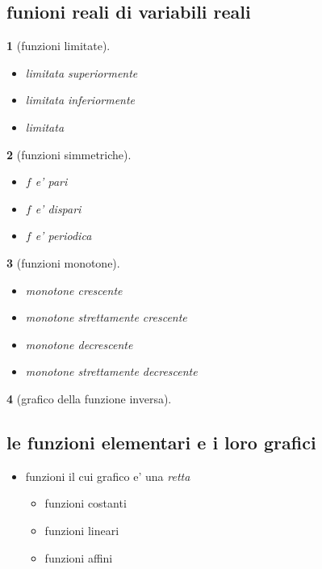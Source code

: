 \documentclass{article}
\theoremstyle{mystyle}
\newtheorem*{mydefinition}{}
\begin{document}
\subsection{funioni reali di variabili reali}
\begin{mydefinition}[funzioni limitate]
    \begin{itemize}
        \item limitata superiormente
        \item limitata inferiormente
        \item limitata
    \end{itemize}
\end{mydefinition}
\begin{mydefinition}[funzioni simmetriche]
\begin{itemize}
    \item $f$ e' \emph{pari}
    \item $f$ e' \emph{dispari}
    \item $f$ e' \emph{periodica}
\end{itemize}
    
\end{mydefinition}
\begin{mydefinition}[funzioni monotone]
\begin{itemize}
    \item \emph{monotone crescente}
    \item \emph{monotone strettamente crescente}
    \item \emph{monotone decrescente}
    \item \emph{monotone strettamente decrescente}
\end{itemize}
    
\end{mydefinition}
\begin{mydefinition}[grafico della funzione inversa]
    
\end{mydefinition}
\subsection{le funzioni elementari e i loro grafici}
\begin{itemize}
    \item funzioni il cui grafico e' una \emph{retta}
    \begin{itemize}
        \item funzioni costanti
        \item funzioni lineari
        \item funzioni affini
    \end{itemize}
\end{itemize}
\end{document}
